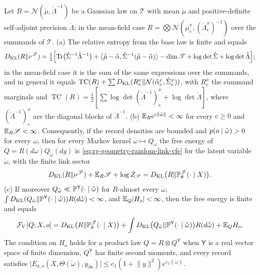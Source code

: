 Let $R=\mathcal N(\mathring\mu,\mathring\Lambda^{-1})$ be a Gaussian law on $\mathscr T$ with mean
$\mathring\mu$ and positive-definite self-adjoint precision $\mathring\Lambda$; in the mean-field case
$R=\bigotimes\mathcal N(\mathring\mu^x_e,(\mathring\Lambda^x_e)^{-1})$ over the summands of $\mathscr T$.
(a) The relative entropy from the base law is finite and equals
\begin{equation}
D_{\mathrm{KL}}(R\Vert\nu^{\mathscr T})
=\tfrac12\Bigl[\operatorname{Tr}\bigl(\mathring\Sigma^{-1}\mathring\Lambda^{-1}\bigr)
+\bigl\langle\mathring\mu-\mathring\alpha,\mathring\Sigma^{-1}(\mathring\mu-\mathring\alpha)\bigr\rangle
-\dim\mathscr T+\log\det\mathring\Sigma+\log\det\mathring\Lambda\Bigr];
\label{eq:link-gaussian-kl}
\end{equation}
in the mean-field case it is the sum of the same expressions over the summands, and in general it equals
$\operatorname{TC}(R)+\sum D_{\mathrm{KL}}(R^x_e\Vert\mathcal N(\mathring\alpha^x_e,\mathring\Sigma^x_e))$, with $R^x_e$ the
summand marginals and
$\operatorname{TC}(R)=\frac12[\sum\log\det(\mathring\Lambda^{-1})^x_e+\log\det\mathring\Lambda]$, where
$(\mathring\Lambda^{-1})^x_e$ are the diagonal blocks of $\mathring\Lambda^{-1}$. (b)
$\mathbb E_Re^{\mathrm c\lVert\mathring\omega\rVert}<\infty$ for every $\mathrm c\geq0$ and $\mathbb E_R\mathscr S<\infty$.
Consequently, if the record densities are bounded and $p(o\mid\mathring\omega)>0$ for every
$\mathring\omega$, then for every Markov kernel $\mathring\omega\mapsto Q_{\mathring\omega}$ the free energy of
$Q=R(d\mathring\omega)Q_{\mathring\omega}(dy)$ is \eqref{eq:rg-geometry-random-link-vfe} for the latent variable
$\mathring\omega$, with the finite link sector
\begin{equation}
D_{\mathrm{KL}}(R\Vert\nu^{\mathscr T})+\mathbb E_R\mathscr S+\log Z_{\mathscr S}=D_{\mathrm{KL}}\bigl(R\Vert\mathbb P^{\mathscr T}_\theta(\cdot\mid X)\bigr).
\label{eq:link-sector}
\end{equation}
(c) If moreover $Q_{\mathring\omega}\ll\mathbb P^{\mathsf Y}(\cdot\mid\mathring\omega)$ for $R$-almost every
$\mathring\omega$, $\int D_{\mathrm{KL}}(Q_{\mathring\omega}\Vert\mathbb P^{\mathsf Y}(\cdot\mid\mathring\omega))R(d\mathring\omega)<\infty$,
and $\mathbb E_Q\lvert H_o\rvert<\infty$, then the free energy is finite and equals
\begin{equation}
\mathcal F_V[Q;X,o]=D_{\mathrm{KL}}\bigl(R\Vert\mathbb P^{\mathscr T}_\theta(\cdot\mid X)\bigr)
+\int D_{\mathrm{KL}}\bigl(Q_{\mathring\omega}\Vert\mathbb P^{\mathsf Y}(\cdot\mid\mathring\omega)\bigr)R(d\mathring\omega)
+\mathbb E_QH_o.
\label{eq:link-gaussian-energy-form}
\end{equation}
The condition on $H_o$ holds for a product law $Q=R\otimes Q^{\mathsf Y}$ when $\mathsf Y$ is a real vector
space of finite dimension, $Q^{\mathsf Y}$ has finite second moments, and every record satisfies
$\lvert E_{a,o}(X,\Theta(\mathring\omega),y_{\partial a})\rvert\leq\mathrm c_1(1+\lVert y\rVert^2)e^{\mathrm c_2\lVert\mathring\omega\rVert}$.

